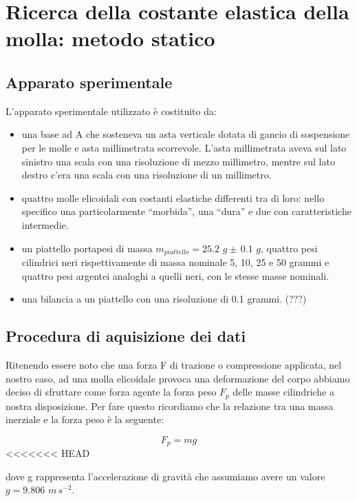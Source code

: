 \section{Ricerca della costante elastica della molla: metodo statico}

\subsection{Apparato sperimentale}
L'apparato sperimentale utilizzato è costituito da:
	\begin{itemize}
		\item{una base ad A che sosteneva un asta verticale dotata di gancio di sospensione per le molle e asta millimetrata scorrevole. L'asta millimetrata aveva sul lato sinistro una scala con una risoluzione di mezzo millimetro, mentre sul lato destro c'era una scala con una risoluzione di un millimetro.}
		\item{quattro molle elicoidali con costanti elastiche differenti tra di loro: nello specifico una particolarmente ``morbida'', una ``dura'' e due con caratteristiche intermedie.}
		\item{un piattello portapesi di massa $m_{piattello} = 25.2\,\,g \pm\, 0.1\,\,g$, quattro pesi cilindrici neri rispettivamente di massa nominale 5, 10, 25 e 50 grammi e quattro pesi argentei analoghi a quelli neri, con le stesse masse nominali.}
        \item{una bilancia a un piattello con una risoluzione di 0.1 grammi. (???)}
	\end{itemize}

\subsection{Procedura di aquisizione dei dati}

Ritenendo essere noto che una forza F di trazione o compressione applicata, nel nostro caso, ad una molla elicoidale provoca una deformazione del corpo abbiamo deciso di sfruttare come forza agente la forza peso $F_{p}$ delle masse cilindriche a nostra disposizione. Per fare questo ricordiamo che la relazione tra una massa inerziale e la forza peso è la seguente:

\begin{equation}
	F_{p} = mg
\end{equation}
<<<<<<< HEAD

dove g rappresenta l'accelerazione di gravità che assumiamo avere un valore $g = 9.806\,\,m\,s^{-2}$.

